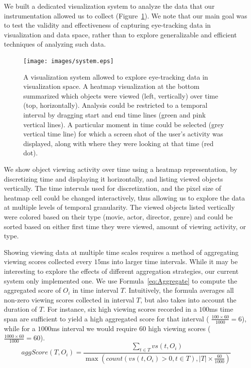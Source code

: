 We built a dedicated visualization system to analyze the data that our instrumentation allowed us to collect (Figure~\ref{fig:system}). We note that our main goal was to test the validity and effectiveness of capturing eye-tracking data in visualization and data space, rather than to explore generalizable and efficient techniques of analyzing such data.  

\begin{figure}[htb]
  \centering
  \texttt{[image: images/system.eps]}
  \caption{A visualization system allowed to explore eye-tracking data in visualization space. A heatmap visualization at the bottom summarized which objects were viewed (left, vertically) over time (top, horizontally). Analysis could be restricted to a temporal interval by dragging start and end time lines (green and pink vertical lines). A particular moment in time could be selected (grey vertical time line) for which a screen shot of the user's activity was displayed, along with where they were looking at that time (red dot). }
	\label{fig:system}
\end{figure}

We show object viewing activity over time using a heatmap representation, by discretizing time and displaying it horizontally, and listing viewed objects vertically. The time intervals used for discretization, and the pixel size of heatmap cell could be changed interactively, thus allowing us to explore the data at multiple levels of temporal granularity. The viewed objects listed vertically were colored based on their type (movie, actor, director, genre) and could be sorted based on either first time they were viewed, amount of viewing activity, or type. 

Showing viewing data at multiple time scales requires a method of aggregating viewing scores collected every $15$ms into larger time intervals. While it may be interesting to explore the effects of different aggregation strategies, our current system only implemented one. We use Formula~\ref{eq:Aggregate} to compute the aggregated score of $O_i$ in time interval $T$. Intuitively, the formula averages all non-zero viewing scores collected in interval $T$, but also takes into account the duration of $T$. For instance, six high viewing scores recorded in a $100$ms time span are sufficient to yield a high aggregated score for that interval ( $\frac{100 \times 60 }{1000} = 6$), while for a $1000$ms interval we would require $60$ high viewing scores ( $\frac{1000 \times 60 }{1000} = 60$).
\begin{equation}
aggScore(T,O_i) = \frac{\displaystyle\sum_{t \in T }{vs(t, O_i)}}{\max (count(vs(t, O_i) > 0 , t \in T),|T| \times \frac{60}{1000}) }
\label{eq:Aggregate}
\end{equation}

